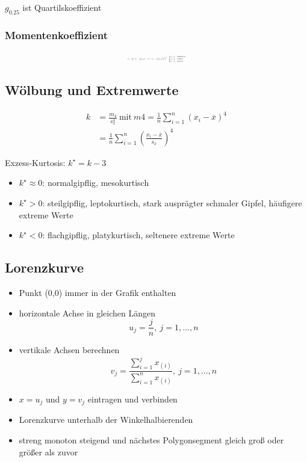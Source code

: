 \documentclass[10pt,a4paper,landscape]{article}
\begin{document}
\begin{multicols}{4}
$g_{0.25}$ ist Quartilskoeffizient
\subsubsection*{Momentenkoeffizient}
\[\resizebox{0.2\textwidth}{!}{$
g_m = \frac{m_3}{s_x^3}, ~ m_3=\frac{1}{n}\sum_{i=1}^n(x_i - \overline{x})^3 \Rightarrow 
g_m = \frac{1}{n}\sum_{i=1}^n\left(\frac{x_i-\overline{x}}{s_x}\right)^3 = 
\begin{cases}
g_m = 0 ~&\text{symmetrisch} \\
g_m > 0 ~&\text{linkssteil} \\
g_m < 0 ~&\text{rechtsteil} 
\end{cases}
$}
\]

\subsection{Wölbung und Extremwerte}
\begin{align*}
k &= \frac{m_4}{s_x^4} ~\text{mit}~ m4=\frac{1}{n}\sum_{i=1}^n(x_i - \overline{x})^4 \\
&= \frac{1}{n}\sum_{i=1}^n\left(\frac{x_i - \overline{x}}{s_x}\right)^4
\end{align*}

Exzess-Kurtosis: $k^\star = k-3$
\begin{itemize}
\item $k^\star \approx 0$: normalgipflig, mesokurtisch
\item $k^\star > 0 $: steilgipflig, leptokurtisch, stark ausprägter schmaler Gipfel, häufigere extreme Werte
\item $k^\star < 0$: flachgipflig, platykurtisch, seltenere extreme Werte
\end{itemize}

\subsection{Lorenzkurve}
\begin{itemize}
\item Punkt (0,0) immer in der Grafik enthalten
\item horizontale Achse in gleichen Längen
\[
u_j=\frac{j}{n}, ~j =1,...,n
\]
\item vertikale Achsen berechnen
\[
v_j = \frac{ \sum_{i=1}^jx_{(i)} }{ \sum_{i=1}^n x_{(i)} }, ~j=1,...,n
\]
\item $x=u_j$ und $y=v_j$ eintragen und verbinden
\item Lorenzkurve unterhalb der Winkelhalbierenden
\item streng monoton steigend und nächstes Polygonsegment gleich groß oder größer als zuvor
\end{itemize}


\end{multicols}
\end{document}
